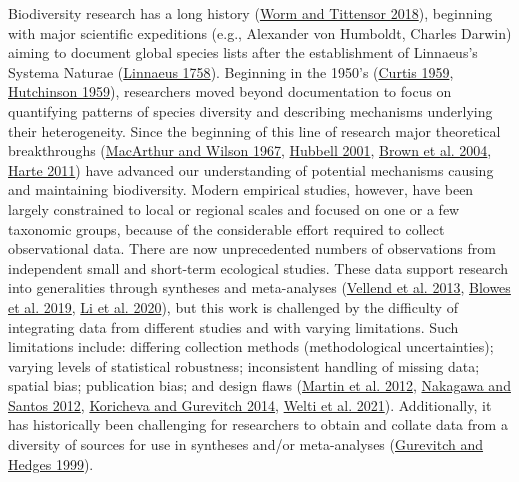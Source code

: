 \documentclass[
  12pt,
]{article}
\begin{document}
Biodiversity research has a long history (\protect\hyperlink{ref-worm2018theory}{Worm and Tittensor 2018}), beginning with major scientific expeditions (e.g., Alexander von Humboldt, Charles Darwin) aiming to document global species lists after the establishment of Linnaeus's Systema Naturae (\protect\hyperlink{ref-linnaeus1758systema}{Linnaeus 1758}). Beginning in the 1950's (\protect\hyperlink{ref-curtis1959vegetation}{Curtis 1959}, \protect\hyperlink{ref-hutchinson1959homage}{Hutchinson 1959}), researchers moved beyond documentation to focus on quantifying patterns of species diversity and describing mechanisms underlying their heterogeneity. Since the beginning of this line of research major theoretical breakthroughs (\protect\hyperlink{ref-macarthur1967theory}{MacArthur and Wilson 1967}, \protect\hyperlink{ref-hubbell2001unified}{Hubbell 2001}, \protect\hyperlink{ref-brown2004toward}{Brown et al. 2004}, \protect\hyperlink{ref-harte2011maximum}{Harte 2011}) have advanced our understanding of potential mechanisms causing and maintaining biodiversity. Modern empirical studies, however, have been largely constrained to local or regional scales and focused on one or a few taxonomic groups, because of the considerable effort required to collect observational data. There are now unprecedented numbers of observations from independent small and short-term ecological studies. These data support research into generalities through syntheses and meta-analyses (\protect\hyperlink{ref-vellend2013global}{Vellend et al. 2013}, \protect\hyperlink{ref-blowes2019geography}{Blowes et al. 2019}, \protect\hyperlink{ref-li2020changes}{Li et al. 2020}), but this work is challenged by the difficulty of integrating data from different studies and with varying limitations. Such limitations include: differing collection methods (methodological uncertainties); varying levels of statistical robustness; inconsistent handling of missing data; spatial bias; publication bias; and design flaws (\protect\hyperlink{ref-martin2012mapping}{Martin et al. 2012}, \protect\hyperlink{ref-nakagawa2012methodological}{Nakagawa and Santos 2012}, \protect\hyperlink{ref-koricheva2014uses}{Koricheva and Gurevitch 2014}, \protect\hyperlink{ref-welti2021meta}{Welti et al. 2021}). Additionally, it has historically been challenging for researchers to obtain and collate data from a diversity of sources for use in syntheses and/or meta-analyses (\protect\hyperlink{ref-gurevitch1999statistical}{Gurevitch and Hedges 1999}).
\end{document}
